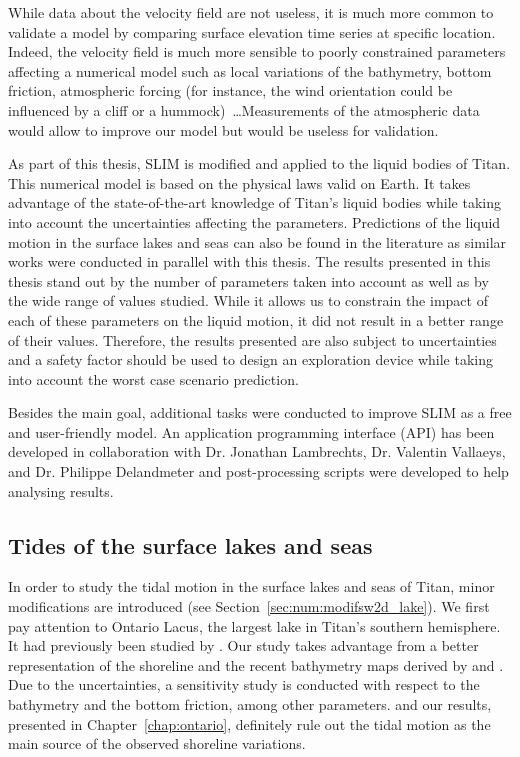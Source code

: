 While data about the velocity field are not useless, it is much more common to validate a model by comparing surface elevation time series at specific location. Indeed, the velocity field is much more sensible to poorly constrained parameters affecting a numerical model such as local variations of the bathymetry, bottom friction, atmospheric forcing (for instance, the wind orientation could be influenced by a cliff or a hummock)~\dots Measurements of the atmospheric data would allow to improve our model but would be useless for validation.


As part of this thesis, SLIM is modified and applied to the liquid bodies of Titan. This numerical model is based on the physical laws valid on Earth. It takes advantage of the state-of-the-art knowledge of Titan's liquid bodies while taking into account the uncertainties affecting the parameters. Predictions of the liquid motion in the surface lakes and seas can also be found in the literature as similar works were conducted in parallel with this thesis. The results presented in this thesis stand out by the number of parameters taken into account as well as by the wide range of values studied. While it allows us to constrain the impact of each of these parameters on the liquid motion, it did not result in a better range of their values. Therefore, the results presented are also subject to uncertainties and a safety factor should be used to design an exploration device while taking into account the worst case scenario prediction.

Besides the main goal, additional tasks were conducted to improve SLIM as a free and user-friendly model. An application programming interface (API) has been developed in collaboration with Dr. Jonathan Lambrechts, Dr. Valentin Vallaeys, and Dr. Philippe Delandmeter and post-processing scripts were developed to help analysing results. 


\subsection{Tides of the surface lakes and seas}
In order to study the tidal motion in the surface lakes and seas of Titan, minor modifications are introduced (see Section~\ref{sec:num:modifsw2d_lake}). We first pay attention to Ontario Lacus, the largest lake in Titan's southern hemisphere. It had previously been studied by \citet{tokano2010simulation}. Our study takes advantage from a better representation of the shoreline and the recent bathymetry maps derived by \cite{ventura2012electromagnetic} and \cite{hayes2016lakes}. Due to the uncertainties, a sensitivity study is conducted with respect to the bathymetry and the bottom friction, among other parameters. \cite{tokano2010simulation} and our results, presented in Chapter~\ref{chap:ontario}, definitely rule out the tidal motion as the main source of the observed shoreline variations. 

